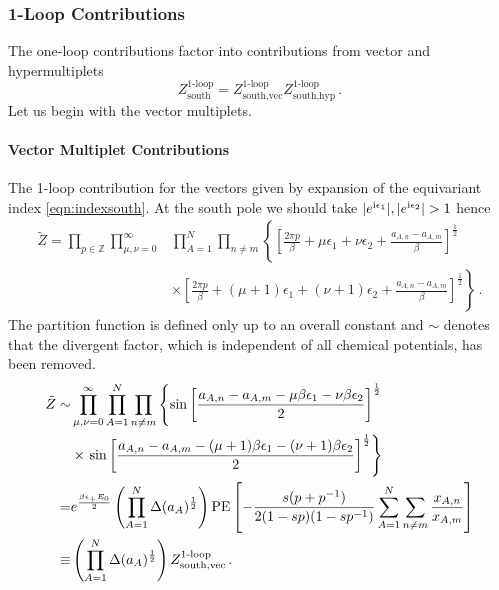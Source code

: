 \documentclass[main.tex]{subfiles}
\begin{document}
\subsubsection{1-Loop Contributions}
The one-loop contributions factor into contributions from vector and hypermultiplets
\begin{equation}
Z^{\text{1-loop}}_{\text{south}}=Z^{\text{1-loop}}_{\text{south},\text{vec}}Z^{\text{1-loop}}_{\text{south},\text{hyp}}\,.
\end{equation}
Let us begin with the vector multiplets.
\paragraph{Vector Multiplet Contributions} 
The 1-loop contribution for the vectors given by expansion of the equivariant index \eqref{eqn:indexsouth}. At the south pole we should take $|e^{\iu\epsilon_1}|,|e^{\iu\epsilon_2}|>1$ hence 
\begin{equation}
\begin{aligned}
\tilde{Z}=\prod_{p\in\mathbb{Z}}\prod_{\mu,\nu=0}^{\infty}&\prod_{A=1}^N\prod_{n\neq m}\left\{\left[\frac{2\pi p}{\beta}+\mu\epsilon_1+\nu\epsilon_2+\frac{a_{A,n}-a_{A,m}}{\beta}\right]^{\frac{1}{2}}\right.\\
&\times\left.\left[\frac{2\pi p}{\beta}+(\mu+1)\epsilon_1+(\nu+1)\epsilon_2+\frac{a_{A,n}-a_{A,m}}{\beta}\right]^{\frac{1}{2}}\right\}\,.
\end{aligned}
\end{equation}
The partition function is defined only up to an overall constant and $\sim$ denotes that the divergent factor, which is independent of all chemical potentials, has been removed. 
\begin{equation}
\begin{aligned}
\tilde{Z}\sim&\prod_{\mu,\nu=0}^{\infty}\prod_{A=1}^N\prod_{n\neq m}\left\{\sin\left[\frac{ a_{A,n}- a_{A,m}- \mu\beta\epsilon_1- \nu\beta\epsilon_2}{2}\right]^{\frac{1}{2}}\right.\\
&\times\left.\sin\left[\frac{ a_{A,n}- a_{A,m}-(\mu+1)\beta\epsilon_1-(\nu+1)\beta\epsilon_2}{2}\right]^{\frac{1}{2}}\right\}\\
=&e^{\frac{\beta\epsilon_+E_0}{2}}\left(\prod_{A=1}^N\Delta(a_A)^{\frac{1}{2}}\right)\operatorname{\mathrm{PE}}\left[-\frac{s(p+p^{-1})}{2(1-sp)(1-sp^{-1})}\sum_{A=1}^N\sum_{n\neq m}\frac{x_{A,n}}{x_{A,m}}\right]\\
\equiv& \left(\prod_{A=1}^N\Delta(a_A)^{\frac{1}{2}}\right)Z^{\text{1-loop}}_{\text{south},\text{vec}}\,.
\end{aligned}
\end{equation}
\end{document}
